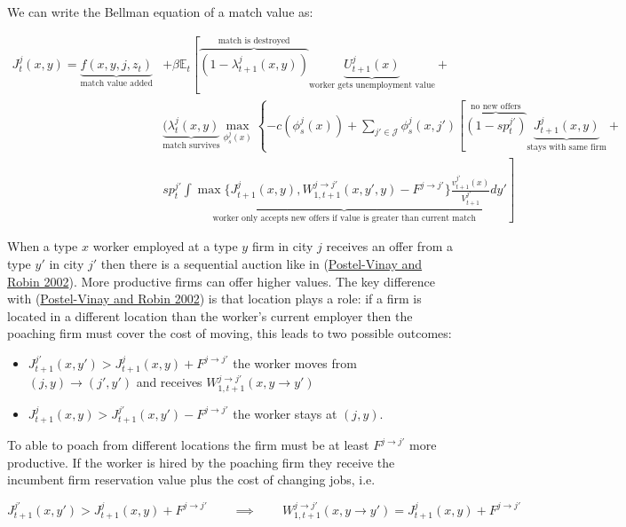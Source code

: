 \documentclass[
  letterpaper,
  DIV=11,
  numbers=noendperiod]{scrreprt}
\providecommand{\tightlist}{%
  \setlength{\itemsep}{0pt}\setlength{\parskip}{0pt}}\usepackage{longtable,booktabs,array}
\begin{document}
We can write the Bellman equation of a match value as:

\begin{align*}
J^j_t(x,y) = \underbrace{f(x,y,j,z_t)}_{\text{match value added}} &+ \beta\mathbb{E}_t\left[  \overbrace{ (1-\lambda^j_{t+1}(x,y)) }^{\text{match is destroyed}}\underbrace{U^{j}_{t+1}(x)}_{\text{worker gets unemployment value}} \right. + \\
  & \underbrace{(\lambda^j_t(x,y)}_{\text{match survives}} \max_{\phi_s^j(x)}\left\{-c(\phi_s^j(x)) +  \sum_{j'\in\mathcal{J}}\phi^j_s(x,j')\left[ \overbrace{(1-sp^{j'}_t)}^{\text{no new offers}} \underbrace{J^j_{t+1}(x,y)}_{\text{stays with same firm}} \right. \right. +\\
& sp^{j'}_t \left. \underbrace{\int\max\{J^{j}_{t+1}(x,y),W^{j\to j'}_{1,t+1}(x,y',y)-F^{j\to j'}\}\frac{v^{j'}_{t+1}(x)}{V^{j'}_{t+1}}dy'}_{\text{worker only accepts new offers if value is greater than current match}}  \right]
\end{align*}

When a type \(x\) worker employed at a type \(y\) firm in city \(j\)
receives an offer from a type \(y'\) in city \(j'\) then there is a
sequential auction like in
(\protect\hyperlink{ref-postel-vinayEquilibriumWageDispersion2002}{Postel-Vinay
and Robin 2002}). More productive firms can offer higher values. The key
difference with
(\protect\hyperlink{ref-postel-vinayEquilibriumWageDispersion2002}{Postel-Vinay
and Robin 2002}) is that location plays a role: if a firm is located in
a different location than the worker's current employer then the
poaching firm must cover the cost of moving, this leads to two possible
outcomes:

\begin{itemize}
\tightlist
\item
  \(J^{j'}_{t+1}(x,y')>J^j_{t+1}(x,y)+F^{j\to j'}\) the worker moves
  from \((j,y) \to (j',y')\) and receives
  \(W^{j\to j'}_{1,t+1}(x,y \to y')\)
\item
  \(J^j_{t+1}(x,y)>J^{j'}_{t+1}(x,y')-F^{j\to j'}\) the worker stays at
  \((j,y)\).
\end{itemize}

To able to poach from different locations the firm must be at least
\(F^{j\to j'}\) more productive. If the worker is hired by the poaching
firm they receive the incumbent firm reservation value plus the cost of
changing jobs, i.e.

\[J^{j'}_{t+1}(x,y')>J^{j}_{t+1}(x,y)+F^{j\to j'}  \qquad \implies \qquad W^{j\to j'}_{1,t+1}(x,y\to y') = J^{j}_{t+1}(x,y)+F^{j\to j'}\]
\end{document}
